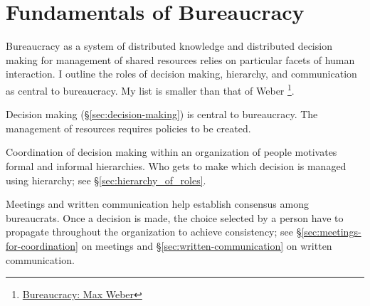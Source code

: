 \section{Fundamentals of Bureaucracy\label{fundamentals_of_b}}
  
Bureaucracy as a system of distributed knowledge and distributed decision making for management of shared resources relies on particular facets of human interaction. I outline the roles of decision making, hierarchy, and communication as central to bureaucracy. My list is smaller than that of Weber \cite{2015_Weber}\footnote{\href{https://en.wikipedia.org/wiki/Bureaucracy\#Max_Weber}{Bureaucracy: Max Weber}}.

Decision making (\S\ref{sec:decision-making}) is central to bureaucracy. The management of resources requires policies to be created. 

Coordination of decision making within an organization of people motivates formal and informal hierarchies. Who gets to make which decision is managed using hierarchy; see \S\ref{sec:hierarchy_of_roles}.

Meetings and written communication help establish consensus among bureaucrats.
Once a decision is made, the choice selected by a person have to propagate throughout the organization to achieve consistency; see \S\ref{sec:meetings-for-coordination} on meetings and \S\ref{sec:written-communication} on written communication.
